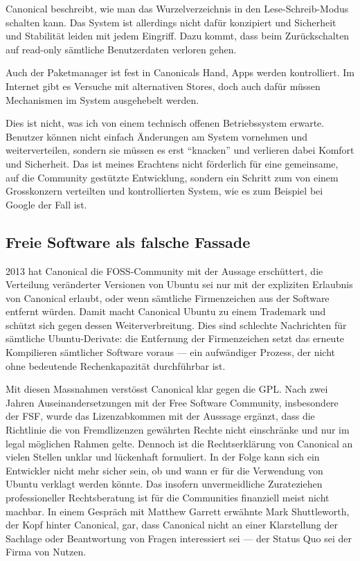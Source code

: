 Canonical beschreibt, wie man das Wurzelverzeichnis in den \mbox{Lese-Schreib-Modus} schalten kann\thinspace\cite{online:ubuntutouch-readwrite}. Das System ist allerdings nicht dafür konzipiert und Sicherheit und Stabilität leiden mit jedem Eingriff. Dazu kommt, dass beim Zurückschalten auf \mbox{read-only} sämtliche Benutzerdaten verloren gehen.

Auch der Paketmanager ist fest in Canonicals Hand, Apps werden kontrolliert\thinspace\cite{online:ubuntutouch-publish}. Im Internet gibt es Versuche mit alternativen Stores, doch auch dafür müssen Mechanismen im System ausgehebelt werden\thinspace\cite{online:ubuntutouch-jailbreak}.

Dies ist nicht, was ich von einem technisch offenen Betriebssystem erwarte. Benutzer können nicht einfach Änderungen am System vornehmen und weiterverteilen, sondern sie müssen es erst ``knacken'' und verlieren dabei Komfort und Sicherheit. Das ist meines Erachtens nicht förderlich für eine gemeinsame, auf die Community gestützte Entwicklung, sondern ein Schritt zum von einem Grosskonzern verteilten und kontrollierten System, wie es zum Beispiel bei Google der Fall ist.
\newline

\subsection{Freie Software als falsche Fassade}
2013 hat Canonical die \mbox{FOSS-Community} mit der Aussage erschüttert, die Verteilung veränderter Versionen von Ubuntu sei nur mit der expliziten Erlaubnis von Canonical erlaubt, oder wenn sämtliche Firmenzeichen aus der Software entfernt würden\thinspace\cite{online:ubuntutouch-mjgIn}. Damit macht Canonical Ubuntu zu einem Trademark und schützt sich gegen dessen Weiterverbreitung. Dies sind schlechte Nachrichten für sämtliche \mbox{Ubuntu-Derivate}: die Entfernung der Firmenzeichen setzt das erneute Kompilieren sämtlicher Software voraus\thinspace\cite{online:ubuntutouch-mjgLicense} --- ein aufwändiger Prozess, der nicht ohne bedeutende Rechenkapazität durchführbar ist.

Mit diesen Massnahmen verstösst Canonical klar gegen die GPL\thinspace\cite{online:ubuntutouch-fsf}. Nach zwei Jahren Auseinandersetzungen mit der Free Software Community, insbesondere der FSF, wurde das Lizenzabkommen mit der Ausssage ergänzt, dass die Richtlinie die von Fremdlizenzen gewährten Rechte nicht einschränke und nur im legal möglichen Rahmen gelte\thinspace\cite{online:ubuntutouch-ip}. Dennoch ist die Rechtserklärung von Canonical an vielen Stellen unklar und lückenhaft formuliert\thinspace\cite{online:ubuntutouch-uncertain}. In der Folge kann sich ein Entwickler nicht mehr sicher sein, ob und wann er für die Verwendung von Ubuntu verklagt werden könnte. Das insofern unvermeidliche Zurateziehen professioneller Rechtsberatung ist für die Communities finanziell meist nicht machbar\thinspace\cite{online:ubuntutouch-mjgLicense}. In einem Gespräch mit Matthew Garrett\thinspace\cite{online:ubuntutouch-mjgConversation} erwähnte Mark Shuttleworth, der Kopf hinter Canonical, gar, dass Canonical nicht an einer Klarstellung der Sachlage oder Beantwortung von Fragen interessiert sei --- der Status Quo sei der Firma von Nutzen.

